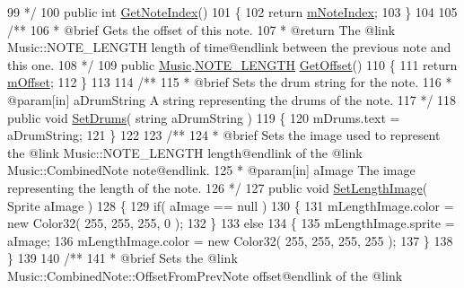 \begin{DoxyCodeInclude}
99 \textcolor{comment}{    */}
100     \textcolor{keyword}{public} \textcolor{keywordtype}{int} \hyperlink{group___s_c___n_d_p_unity_ga8beef050026ade4ba4ccb574c414d24e}{GetNoteIndex}()
101     \{
102         \textcolor{keywordflow}{return} \hyperlink{group___s_c___n_d_p_priv_var_ga11933919195aba904a4e8bf95f131e49}{mNoteIndex};
103     \}
104 \textcolor{comment}{}
105 \textcolor{comment}{    /**}
106 \textcolor{comment}{     * @brief Gets the offset of this note.}
107 \textcolor{comment}{     * @return The @link Music::NOTE\_LENGTH length of time@endlink between the previous note and this one.}
108 \textcolor{comment}{    */}
109     \textcolor{keyword}{public} \hyperlink{class_music}{Music}.\hyperlink{group___music_enums_gaf11b5f079adbb21c800b9eca1c5c3cbd}{NOTE\_LENGTH} \hyperlink{group___s_c___n_d_p_unity_ga371654221730812200062322c8a3e750}{GetOffset}()
110     \{
111         \textcolor{keywordflow}{return} \hyperlink{group___s_c___n_d_p_priv_var_ga0a78a2c25da29d944d56d1c8ebb74d03}{mOffset};
112     \}
113 \textcolor{comment}{}
114 \textcolor{comment}{    /**}
115 \textcolor{comment}{     * @brief Sets the drum string for the note.}
116 \textcolor{comment}{     * @param[in] aDrumString A string representing the drums of the note.}
117 \textcolor{comment}{    */}
118     \textcolor{keyword}{public} \textcolor{keywordtype}{void} \hyperlink{group___s_c___n_d_p_unity_gae14b5564be204df7699b95186d83f69f}{SetDrums}( \textcolor{keywordtype}{string} aDrumString )
119     \{
120         mDrums.text = aDrumString;
121     \}
122 \textcolor{comment}{}
123 \textcolor{comment}{    /**}
124 \textcolor{comment}{     * @brief Sets the image used to represent the @link Music::NOTE\_LENGTH length@endlink of the @link
       Music::CombinedNote note@endlink.}
125 \textcolor{comment}{     * @param[in] aImage The image representing the length of the note.}
126 \textcolor{comment}{    */}
127     \textcolor{keyword}{public} \textcolor{keywordtype}{void} \hyperlink{group___s_c___n_d_p_unity_ga1a1c4b8111463ec3e134d17fe5064a54}{SetLengthImage}( Sprite aImage )
128     \{
129         \textcolor{keywordflow}{if}( aImage == null )
130         \{
131             mLengthImage.color = \textcolor{keyword}{new} Color32( 255, 255, 255, 0 );
132         \}
133         \textcolor{keywordflow}{else}
134         \{
135             mLengthImage.sprite = aImage;
136             mLengthImage.color = \textcolor{keyword}{new} Color32( 255, 255, 255, 255 );
137         \}
138     \}
139 \textcolor{comment}{}
140 \textcolor{comment}{    /**}
141 \textcolor{comment}{     * @brief Sets the @link Music::CombinedNote::OffsetFromPrevNote offset@endlink of the @link
}
\end{DoxyCodeInclude}
